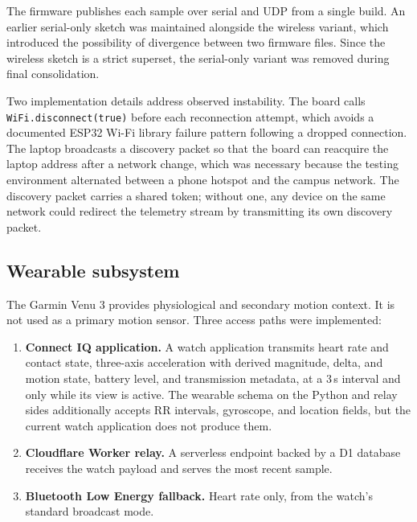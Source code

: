 \documentclass[11pt,a4paper]{article}
\newcommand{\code}[1]{\texttt{\small #1}}
\begin{document}
The firmware publishes each sample over serial and UDP from a single build. An
earlier serial-only sketch was maintained alongside the wireless variant, which
introduced the possibility of divergence between two firmware files. Since the
wireless sketch is a strict superset, the serial-only variant was removed during
final consolidation.

Two implementation details address observed instability. The board calls
\code{WiFi.\allowbreak disconnect\allowbreak (true)} before each reconnection attempt, which avoids a
documented ESP32 Wi-Fi library failure pattern following a dropped connection.
The laptop broadcasts a discovery packet so that the board can reacquire the
laptop address after a network change, which was necessary because the testing
environment alternated between a phone hotspot and the campus network. The
discovery packet carries a shared token; without one, any device on the same
network could redirect the telemetry stream by transmitting its own discovery
packet.

\subsection{Wearable subsystem}

The Garmin Venu 3 provides physiological and secondary motion context. It is not
used as a primary motion sensor. Three access paths were implemented:

\begin{enumerate}
\item \textbf{Connect IQ application.} A watch application transmits heart rate
and contact state, three-axis acceleration with derived magnitude, delta, and
motion state, battery level, and transmission metadata, at a 3\,s interval and
only while its view is active. The wearable schema on the Python and relay sides
additionally accepts RR intervals, gyroscope, and location fields, but the
current watch application does not produce them.
\item \textbf{Cloudflare Worker relay.} A serverless endpoint backed by a D1
database receives the watch payload and serves the most recent sample.
\item \textbf{Bluetooth Low Energy fallback.} Heart rate only, from the watch's
standard broadcast mode.
\end{enumerate}
\end{document}
